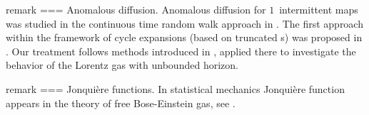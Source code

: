 remark === {Anomalous diffusion.}{
Anomalous diffusion for $1$\dmn\ intermittent maps was studied in
the  continuous time random walk approach in .
The first approach within the framework of cycle expansions
(based on truncated \dzeta s)
was proposed in . Our treatment follows methods
introduced in , applied there to
investigate the behavior of the Lorentz gas with unbounded horizon.
%
%
%
}

remark === {Jonqui\`ere functions.}{
In statistical mechanics Jonqui\`ere function 
appears in the theory of free Bose-Einstein gas, see .
\label{Jonq-funct}
}

